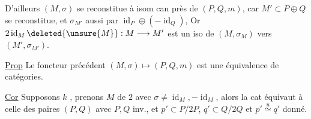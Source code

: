 D'ailleurs  $(M,\sigma)$ se reconstitue à isom can près de
$(P,Q,m)$, car $M'\subset P\oplus Q$ se reconstitue, et
$\sigma_{M'}$ aussi  par $\operatorname{id}_P\oplus(-\operatorname{id}_Q)$,
Or $2\operatorname{id}_M\deleted{\unsure{M}}:M\longrightarrow M'$ est un iso de $(M,\sigma_M)$ vers $(M',\sigma_{M'})$.

\uline{Prop} Le foncteur précédent $(M,\sigma)\longmapsto(P,Q,m)$ est une équivalence
de catégories.

\uline{Cor} Supposons $k$ 
, prenons
 $M$  de  $2$
avec $\sigma\ne\operatorname{id}_M,-\operatorname{id}_M$, alors la cat
  
équivaut à celle des paires $(P,Q)$ avec $P,Q$ inv., et
$p'\subset P/2P$, $q'\subset Q/2Q$ et $p'\overset{u}\simeq q'$ donné.
